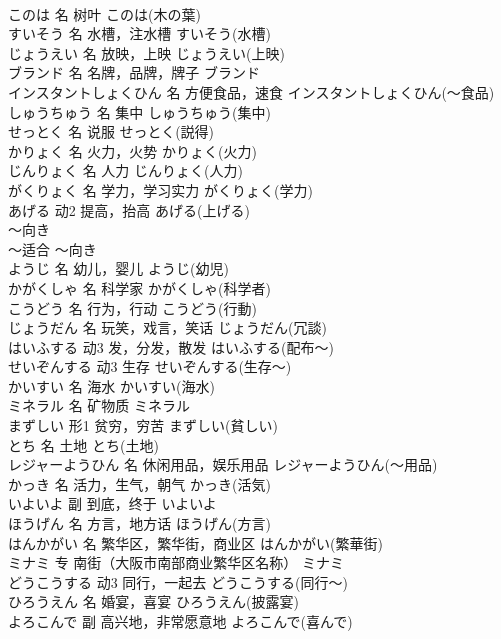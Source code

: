 \documentclass[8pt]{extreport}
\begin{document}
\begin{CJK}{UTF8}{min}
\\	このは	名	树叶	このは(木の葉)	
\\	すいそう	名	水槽，注水槽	すいそう(水槽)	
\\	じょうえい	名	放映，上映	じょうえい(上映)	
\\	ブランド	名	名牌，品牌，牌子	ブランド	
\\	インスタントしょくひん	名	方便食品，速食	インスタントしょくひん(～食品)	
\\	しゅうちゅう	名	集中	しゅうちゅう(集中)	
\\	せっとく	名	说服	せっとく(説得)	
\\	かりょく	名	火力，火势	かりょく(火力)	
\\	じんりょく	名	人力	じんりょく(人力)	
\\	がくりょく	名	学力，学习实力	がくりょく(学力)	
\\	あげる	动2	提高，抬高	あげる(上げる)	
\\	～向き	
\\	～适合	～向き	
\\	ようじ	名	幼儿，婴儿	ようじ(幼児)	
\\	かがくしゃ	名	科学家	かがくしゃ(科学者)	
\\	こうどう	名	行为，行动	こうどう(行動)	
\\	じょうだん	名	玩笑，戏言，笑话	じょうだん(冗談)	
\\	はいふする	动3	发，分发，散发	はいふする(配布～)	
\\	せいぞんする	动3	生存	せいぞんする(生存～)	
\\	かいすい	名	海水	かいすい(海水)	
\\	ミネラル	名	矿物质	ミネラル	
\\	まずしい	形1	贫穷，穷苦	まずしい(貧しい)	
\\	とち	名	土地	とち(土地)	
\\	レジャーようひん	名	休闲用品，娱乐用品	レジャーようひん(～用品)	
\\	かっき	名	活力，生气，朝气	かっき(活気)	
\\	いよいよ	副	到底，终于	いよいよ	
\\	ほうげん	名	方言，地方话	ほうげん(方言)	
\\	はんかがい	名	繁华区，繁华街，商业区	はんかがい(繁華街)	
\\	ミナミ	专	南街（大阪市南部商业繁华区名称）	ミナミ	
\\	どうこうする	动3	同行，一起去	どうこうする(同行～)	
\\	ひろうえん	名	婚宴，喜宴	ひろうえん(披露宴)	
\\	よろこんで	副	高兴地，非常愿意地	よろこんで(喜んで)	

\end{CJK}
\end{document}
